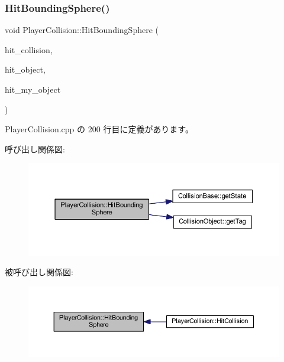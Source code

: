 \subsubsection{\texorpdfstring{Hit\+Bounding\+Sphere()}{HitBoundingSphere()}}
{\footnotesize\ttfamily void Player\+Collision\+::\+Hit\+Bounding\+Sphere (\begin{DoxyParamCaption}\item[{\mbox{\hyperlink{class_collision_base}{Collision\+Base}} $\ast$}]{hit\+\_\+collision,  }\item[{\mbox{\hyperlink{class_collision_object}{Collision\+Object}} $\ast$}]{hit\+\_\+object,  }\item[{\mbox{\hyperlink{class_collision_object}{Collision\+Object}} $\ast$}]{hit\+\_\+my\+\_\+object }\end{DoxyParamCaption})\hspace{0.3cm}{\ttfamily [private]}}



 Player\+Collision.\+cpp の 200 行目に定義があります。

呼び出し関係図\+:\nopagebreak
\begin{figure}[H]
\begin{center}
\leavevmode
\includegraphics[width=350pt]{class_player_collision_ae54c44acd4a1ef4569c1bb9202af3570_cgraph}
\end{center}
\end{figure}
被呼び出し関係図\+:\nopagebreak
\begin{figure}[H]
\begin{center}
\leavevmode
\includegraphics[width=350pt]{class_player_collision_ae54c44acd4a1ef4569c1bb9202af3570_icgraph}
\end{center}
\end{figure}
\mbox{\label{class_player_collision_ad937a5fd226e742270202bf4eff53767}} 
